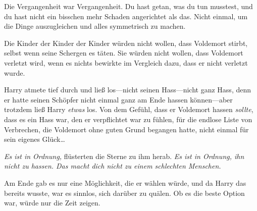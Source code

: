 Die Vergangenheit war Vergangenheit.
Du hast getan, was du tun musstest, und du hast nicht ein bisschen mehr Schaden angerichtet als das. Nicht einmal, um die Dinge auszugleichen und alles symmetrisch zu machen.

Die Kinder der Kinder der Kinder würden nicht wollen, dass Voldemort stirbt, selbst wenn seine Schergen es täten.
Sie würden nicht wollen, dass Voldemort verletzt wird, wenn es nichts bewirkte im Vergleich dazu, dass er nicht verletzt wurde.

Harry atmete tief durch und ließ los—nicht seinen Hass—nicht ganz Hass, denn er hatte seinen Schöpfer nicht einmal ganz am Ende hassen können—aber trotzdem ließ Harry \emph{etwas} los. Von dem Gefühl, dass er Voldemort hassen \emph{sollte}, dass es ein Hass war, den er verpflichtet war zu fühlen, für die endlose Liste von Verbrechen, die Voldemort ohne guten Grund begangen hatte, nicht einmal für sein eigenes Glück…

\emph{Es ist in Ordnung,} flüsterten die Sterne zu ihm herab. \emph{Es ist in Ordnung, ihn nicht zu hassen. Das macht dich nicht zu einem schlechten Menschen.}

Am Ende gab es nur eine Möglichkeit, die er wählen würde, und da Harry das bereits wusste, war es sinnlos, sich darüber zu quälen. Ob es die beste Option war, würde nur die Zeit zeigen.

